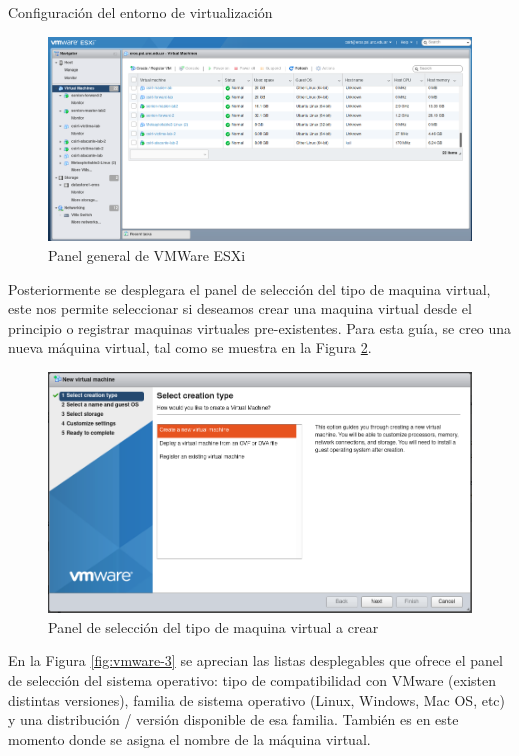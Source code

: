 \begin{section}{Configuración del entorno de virtualización}
\begin{figure}[H]
          \centering
           \includegraphics[width=1\textwidth]{./Anexos-imagenes/vmware-1.png}
            \caption{Panel general de VMWare ESXi}
            \label{fig:vmware-1}
        \end{figure}
        \FloatBarrier
        Posteriormente se desplegara el panel de selección del tipo de maquina virtual, este nos permite seleccionar si deseamos crear una maquina virtual desde el principio o registrar maquinas virtuales pre-existentes. Para esta guía, se creo una nueva máquina virtual, tal como se muestra en la Figura \ref{fig:vmware-2}.
         \begin{figure}[H]
          \centering
           \includegraphics[width=1\textwidth]{./Anexos-imagenes/vmware-2.png}
            \caption{Panel de selección del tipo de maquina virtual a crear}
            \label{fig:vmware-2}
        \end{figure}
        \FloatBarrier
        En la Figura \ref{fig:vmware-3} se aprecian las listas desplegables que ofrece el panel de selección del sistema operativo: tipo de compatibilidad con VMware (existen distintas versiones), familia de sistema operativo (Linux, Windows, Mac OS, etc) y una distribución / versión disponible de esa familia. También es en este momento donde se asigna el nombre de la máquina virtual. 

\end{section}
